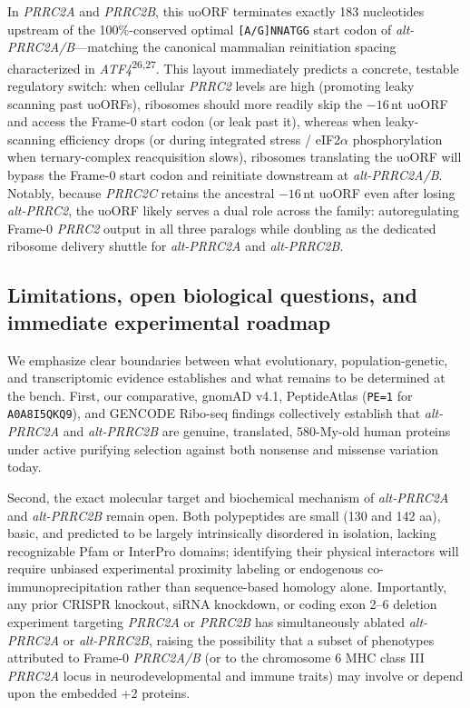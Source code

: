 \documentclass[10pt,letterpaper]{article}
\newcommand{\gene}[1]{\textit{#1}}
\newcommand{\refsup}[1]{\textsuperscript{#1}}
\begin{document}
In \gene{PRRC2A} and \gene{PRRC2B}, this uoORF terminates exactly 183 nucleotides upstream of the 100\%-conserved optimal \texttt{[A/G]NNATGG} start codon of \gene{alt-PRRC2A/B}---matching the canonical mammalian reinitiation spacing characterized in \gene{ATF4}\refsup{26,27}. This layout immediately predicts a concrete, testable regulatory switch: when cellular \gene{PRRC2} levels are high (promoting leaky scanning past uoORFs), ribosomes should more readily skip the $-16$\,nt uoORF and access the Frame-0 start codon (or leak past it), whereas when leaky-scanning efficiency drops (or during integrated stress / eIF2$\alpha$ phosphorylation when ternary-complex reacquisition slows), ribosomes translating the uoORF will bypass the Frame-0 start codon and reinitiate downstream at \gene{alt-PRRC2A/B}. Notably, because \gene{PRRC2C} retains the ancestral $-16$\,nt uoORF even after losing \gene{alt-PRRC2}, the uoORF likely serves a dual role across the family: autoregulating Frame-0 \gene{PRRC2} output in all three paralogs while doubling as the dedicated ribosome delivery shuttle for \gene{alt-PRRC2A} and \gene{alt-PRRC2B}.

\subsection{Limitations, open biological questions, and immediate experimental roadmap}

We emphasize clear boundaries between what evolutionary, population-genetic, and transcriptomic evidence establishes and what remains to be determined at the bench. First, our comparative, gnomAD v4.1, PeptideAtlas (\texttt{PE=1} for \texttt{A0A8I5QKQ9}), and GENCODE Ribo-seq findings collectively establish that \gene{alt-PRRC2A} and \gene{alt-PRRC2B} are genuine, translated, 580-My-old human proteins under active purifying selection against both nonsense and missense variation today.

Second, the exact molecular target and biochemical mechanism of \gene{alt-PRRC2A} and \gene{alt-PRRC2B} remain open. Both polypeptides are small (130 and 142 aa), basic, and predicted to be largely intrinsically disordered in isolation, lacking recognizable Pfam or InterPro domains; identifying their physical interactors will require unbiased experimental proximity labeling or endogenous co-immunoprecipitation rather than sequence-based homology alone. Importantly, any prior CRISPR knockout, siRNA knockdown, or coding exon 2--6 deletion experiment targeting \gene{PRRC2A} or \gene{PRRC2B} has simultaneously ablated \gene{alt-PRRC2A} or \gene{alt-PRRC2B}, raising the possibility that a subset of phenotypes attributed to Frame-0 \gene{PRRC2A/B} (or to the chromosome 6 MHC class III \gene{PRRC2A} locus in neurodevelopmental and immune traits) may involve or depend upon the embedded +2 proteins.
\end{document}
